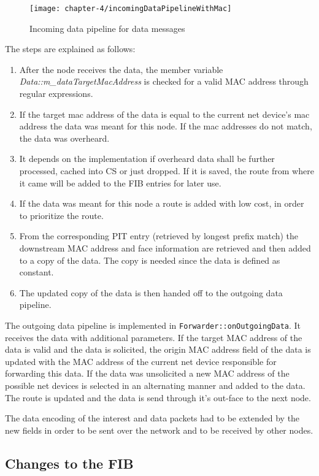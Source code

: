 \begin{figure}[H]
  \centering
  \texttt{[image: chapter-4/incomingDataPipelineWithMac]}
  \caption{Incoming data pipeline for data messages}
  \label{fig:incomingDataPipelineWithMac}
\end{figure}

The steps are explained as follows:

\begin{enumerate}
\item After the node receives the data, the member variable  \emph{Data::m\_dataTargetMacAddress} is checked for a valid MAC address through regular expressions.
\item If the target mac address of the data is equal to the current net device's mac address the data was meant for this node. If the mac addresses do not match, the data was overheard.
\item It depends on the implementation if overheard data shall be further processed, cached into CS or just dropped. If it is saved, the route from where it came will be added to the FIB entries for later use.
\item If the data was meant for this node a route is added with low cost, in order to prioritize the route.
\item From the corresponding PIT entry (retrieved by longest prefix match) the downstream MAC address and face information are retrieved and then added to a copy of the data. The copy is needed since the data is defined as constant.
\item The updated copy of the data is then handed off to the outgoing data pipeline.
\end{enumerate}

The outgoing data pipeline is implemented in \texttt{Forwarder::onOutgoingData}. It receives the data with additional parameters. If the target MAC address of the data is valid and the data is solicited, the origin MAC address field of the data is updated with the MAC address of the current net device responsible for forwarding this data. If the data was unsolicited a new MAC address of the possible net devices is selected in an alternating manner and added to the data. The route is updated and the data is send through it's out-face to the next node.

The data encoding of the interest and data packets had to be extended by the new fields in order to be sent over the network and to be received by other nodes.

\subsection{Changes to the FIB}

